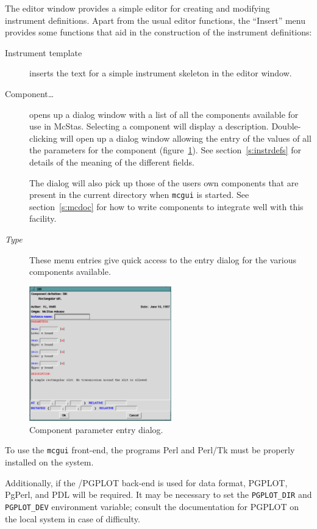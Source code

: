 The editor window provides a simple editor for creating and modifying
instrument definitions. Apart from the usual editor functions, the
``Insert'' menu provides some functions that aid in the construction of
the instrument definitions:
\begin{description}
\item[Instrument template] inserts the text for a simple instrument
  skeleton in the editor window.
\item[Component\ldots] opens up a dialog window with a list of all
  the components available for use in McStas. Selecting a component will
  display a description. Double-clicking will open up a dialog window
  allowing the entry of the values of all the parameters for the
  component (figure~\ref{f:comp_dialog}). See section~\ref{s:instrdefs}
  for details of the meaning of the different fields.

The dialog will also pick up those of the users own components that are
  present in the current directory when \verb+mcgui+ is started. See
  section~\ref{s:mcdoc} for how to write components to integrate well
  with this facility.
\item[\textit{Type}] These menu entries give quick access to the entry
  dialog for the various components available.
\end{description}
\begin{figure}[tbp]
  \begin{center}
    \includegraphics[width=0.55\textwidth]{figures/comp_dialog.eps}
    \caption{Component parameter entry dialog.}
    \label{f:comp_dialog}
  \end{center}
\end{figure}


To use the \verb+mcgui+ front-end, the programs Perl and Perl/Tk must be properly installed on the system. 

Additionally, if the \MCS /PGPLOT back-end is used for data format, PGPLOT,
PgPerl, and PDL will be required.  It may be
necessary to set the \verb+PGPLOT_DIR+ and \verb+PGPLOT_DEV+ environment
variable; consult the documentation for PGPLOT on the local system in case of
difficulty.  

